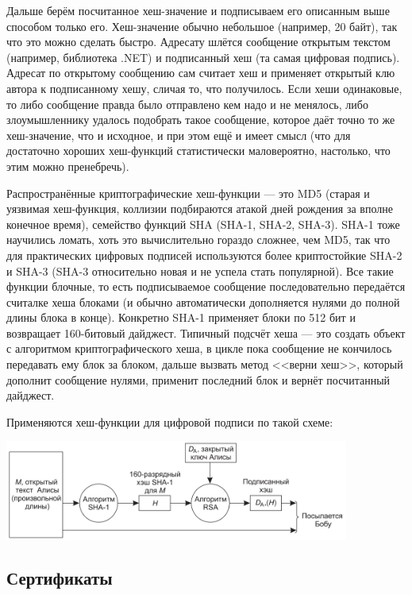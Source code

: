 \documentclass{../mcstext}
\begin{document}
Дальше берём посчитанное хеш-значение и подписываем его описанным выше способом только его. Хеш-значение обычно небольшое (например, 20 байт), так что это можно сделать быстро. Адресату шлётся сообщение открытым текстом (например, библиотека .NET) и подписанный хеш (та самая цифровая подпись). Адресат по открытому сообщению сам считает хеш и применяет открытый клю автора к подписанному хешу, сличая то, что получилось. Если хеши одинаковые, то либо сообщение правда было отправлено кем надо и не менялось, либо злоумышленнику удалось подобрать такое сообщение, которое даёт точно то же хеш-значение, что и исходное, и при этом ещё и имеет смысл (что для достаточно хороших хеш-функций статистически маловероятно, настолько, что этим можно пренебречь).

Распространённые криптографические хеш-функции --- это MD5 (старая и уязвимая хеш-функция, коллизии подбираются атакой дней рождения за вполне конечное время), семейство функций SHA (SHA-1, SHA-2, SHA-3). SHA-1 тоже научились ломать, хоть это вычислительно гораздо сложнее, чем MD5, так что для практических цифровых подписей используются более криптостойкие SHA-2 и SHA-3 (SHA-3 относительно новая и не успела стать популярной). Все такие функции блочные, то есть подписываемое сообщение последовательно передаётся считалке хеша блоками (и обычно автоматически дополняется нулями до полной длины блока в конце). Конкретно SHA-1 применяет блоки по 512 бит и возвращает 160-битовый дайджест. Типичный подсчёт хеша --- это создать объект с алгоритмом криптографического хеша, в цикле пока сообщение не кончилось передавать ему блок за блоком, дальше вызвать метод <<верни хеш>>, который дополнит сообщение нулями, применит последний блок и вернёт посчитанный дайджест.

Применяются хеш-функции для цифровой подписи по такой схеме:

\begin{center}
    \includegraphics[width=0.85\textwidth]{sha1Signature.png}
\end{center}

\subsection{Сертификаты}
\end{document}
